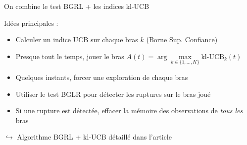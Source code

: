 \documentclass[11pt,french,ignorenonframetext,]{beamer}
\begin{document}
\begin{frame}{On combine le test BGRL + les indices kl-UCB}

  Idées principales :

  \begin{itemize}
    \item Calculer un indice UCB sur chaque bras $k$ (Borne Sup. Confiance)
    \pause
    \item Presque tout le temps, jouer le bras $A(t) = \arg\max\limits_{k\in \{1,\dots,K\}} \mbox{kl-UCB}_k(t)$
    \item Quelques instants, forcer une exploration de chaque bras
    \pause
    \item Utiliser le test BGLR \alert{pour détecter les ruptures sur le bras joué}
    \item Si une rupture est détectée, \alert{effacer la mémoire des observations de \emph{tous les} bras}
  \end{itemize}

  $\hookrightarrow$ Algorithme BGRL + kl-UCB détaillé dans l'article



\end{frame}
\end{document}

